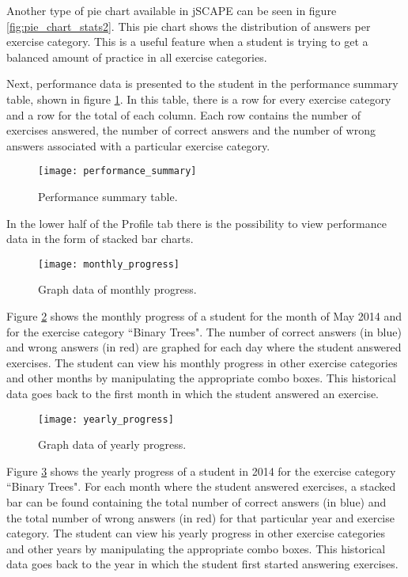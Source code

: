 Another type of pie chart available in jSCAPE can be seen in figure \ref{fig:pie_chart_stats2}. This pie chart shows the distribution of answers per exercise category. This is a useful feature when a student is trying to get a balanced amount of practice in all exercise categories. \newline

Next, performance data is presented to the student in the performance summary table, shown in figure \ref{fig:performance_summary}. In this table, there is a row for every exercise category and a row for the total of each column. Each row contains the number of exercises answered, the number of correct answers and the number of wrong answers associated with a particular exercise category.

\begin{figure}[H]
\centering
\texttt{[image: performance\_summary]}
\caption{Performance summary table.}
\label{fig:performance_summary}
\end{figure}

In the lower half of the Profile tab there is the possibility to view performance data in the form of stacked bar charts.

\begin{figure}[H]
\centering
\texttt{[image: monthly\_progress]}
\caption{Graph data of monthly progress.}
\label{fig:monthly_progress}
\end{figure}

Figure \ref{fig:monthly_progress} shows the monthly progress of a student for the month of May 2014 and for the exercise category ``Binary Trees". The number of correct answers (in blue) and wrong answers (in red) are graphed for each day where the student answered exercises. The student can view his monthly progress in other exercise categories and other months by manipulating the appropriate combo boxes. This historical data goes back to the first month in which the student answered an exercise.

\begin{figure}[H]
\centering
\texttt{[image: yearly\_progress]}
\caption{Graph data of yearly progress.}
\label{fig:yearly_progress}
\end{figure}

Figure \ref{fig:yearly_progress} shows the yearly progress of a student in 2014 for the exercise category ``Binary Trees". For each month where the student answered exercises, a stacked bar can be found containing the total number of correct answers (in blue) and the total number of wrong answers (in red) for that particular year and exercise category. The student can view his yearly progress in other exercise categories and other years by manipulating the appropriate combo boxes. This historical data goes back to the year in which the student first started answering exercises.

